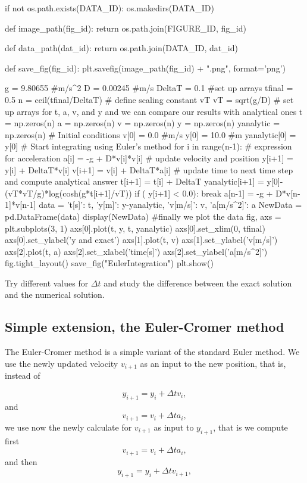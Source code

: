 \documentclass[%
oneside,                 %
final,                   %
10pt]{article}
\begin{document}
if not os.path.exists(DATA_ID):
    os.makedirs(DATA_ID)

def image_path(fig_id):
    return os.path.join(FIGURE_ID, fig_id)

def data_path(dat_id):
    return os.path.join(DATA_ID, dat_id)

def save_fig(fig_id):
    plt.savefig(image_path(fig_id) + ".png", format='png')


g = 9.80655 #m/s^2
D = 0.00245 #m/s
DeltaT = 0.1
#set up arrays 
tfinal = 0.5
n = ceil(tfinal/DeltaT)
# define scaling constant vT
vT = sqrt(g/D)
# set up arrays for t, a, v, and y and we can compare our results with analytical ones
t = np.zeros(n)
a = np.zeros(n)
v = np.zeros(n)
y = np.zeros(n)
yanalytic = np.zeros(n)
# Initial conditions
v[0] = 0.0  #m/s
y[0] = 10.0 #m
yanalytic[0] = y[0]
# Start integrating using Euler's method
for i in range(n-1):
    # expression for acceleration
    a[i] = -g + D*v[i]*v[i]
    # update velocity and position
    y[i+1] = y[i] + DeltaT*v[i]
    v[i+1] = v[i] + DeltaT*a[i]
    # update time to next time step and compute analytical answer
    t[i+1] = t[i] + DeltaT
    yanalytic[i+1] = y[0]-(vT*vT/g)*log(cosh(g*t[i+1]/vT))
    if ( y[i+1] < 0.0):
        break
a[n-1] = -g + D*v[n-1]*v[n-1]
data = {'t[s]': t,
        'y[m]': y-yanalytic,
        'v[m/s]': v,
        'a[m/s^2]': a
        }
NewData = pd.DataFrame(data)
display(NewData)
#finally we plot the data
fig, axs = plt.subplots(3, 1)
axs[0].plot(t, y, t, yanalytic)
axs[0].set_xlim(0, tfinal)
axs[0].set_ylabel('y and exact')
axs[1].plot(t, v)
axs[1].set_ylabel('v[m/s]')
axs[2].plot(t, a)
axs[2].set_xlabel('time[s]')
axs[2].set_ylabel('a[m/s^2]')
fig.tight_layout()
save_fig("EulerIntegration")
plt.show()

\epycod


Try different values for $\Delta t$ and study the difference between the exact solution and the numerical solution.

\subsection{Simple extension, the Euler-Cromer method}

The Euler-Cromer method is a simple variant of the standard Euler
method. We use the newly updated velocity $v_{i+1}$ as an input to the
new position, that is, instead of

\[
y_{i+1} = y_i+\Delta t v_i,
\]
and
\[
v_{i+1} = v_i+\Delta t a_i,
\]
we use now the newly calculate for $v_{i+1}$ as input to $y_{i+1}$, that is 
we compute first 
\[
v_{i+1} = v_i+\Delta t a_i,
\]
and then
\[
y_{i+1} = y_i+\Delta t v_{i+1},
\]
\end{document}
